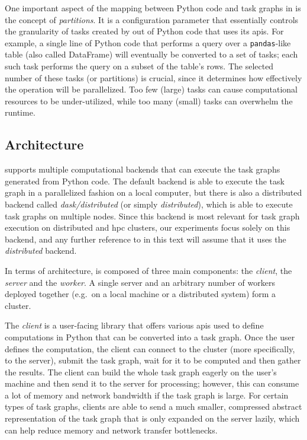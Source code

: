 One important aspect of the mapping between Python code and task graphs in
\dask{} is the concept of \emph{partitions}. It is a configuration
parameter that essentially controls the granularity of tasks created by \dask{}
out of Python code that uses its \glspl{api}. For example, a single line of Python
code that performs a query over a \texttt{pandas}-like table (also called DataFrame)
will eventually be converted to a set of tasks; each such task performs the query on a subset of
the table's rows. The selected number of these tasks (or partitions) is crucial, since it
determines how effectively the operation will be parallelized. Too few (large) tasks can cause
computational resources to be under-utilized, while too many (small) tasks can overwhelm the
\dask{} runtime.

\subsection*{Architecture}
\dask{} supports multiple computational backends that can execute the task
graphs generated from Python code. The default backend is able to execute the task graph in a
parallelized fashion on a local computer, but there is also a distributed backend called
\emph{dask/distributed}
(or simply \emph{distributed}), which is able to execute task graphs on
multiple nodes. Since this backend is most relevant for task graph execution on distributed and
\gls{hpc} clusters, our experiments focus solely on this backend, and any further
reference to \dask{} in this text will assume that it uses the
\emph{distributed} backend.

In terms of architecture, \dask{} is composed of three main components: the
\emph{client}, the \emph{server} and the \emph{worker}. A
single server and an arbitrary number of workers deployed together (e.g.\ on a local machine or a
distributed system) form a \dask{} cluster.

The \emph{client} is a user-facing library that offers various
\glspl{api} used to define computations in Python that can be converted into a task
graph. Once the user defines the computation, the client can connect to the
\dask{} cluster (more specifically, to the server), submit the task graph, wait
for it to be computed and then gather the results. The client can build the whole task graph
eagerly on the user's machine and then send it to the server for processing; however, this can
consume a lot of memory and network bandwidth if the task graph is large. For certain types of task
graphs, clients are able to send a much smaller, compressed abstract representation of the task
graph that is only expanded on the server lazily, which can help reduce memory and network transfer
bottlenecks.

